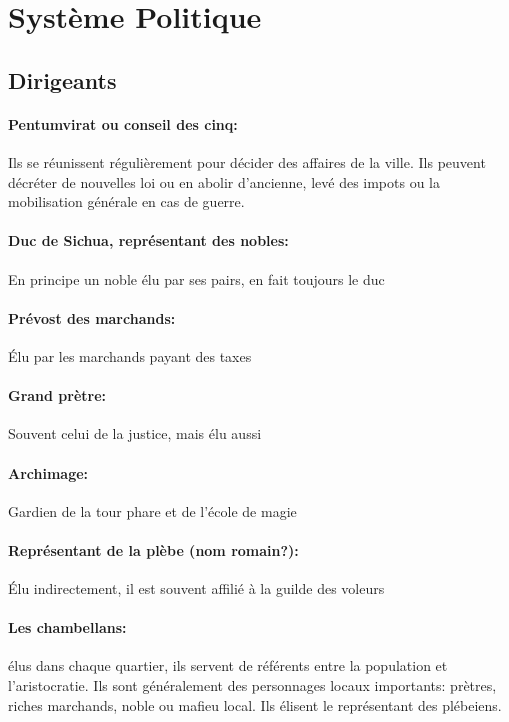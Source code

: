 \section{Système Politique}

\subsection{Dirigeants}

   \paragraph{Pentumvirat ou conseil des cinq: }
       Ils se réunissent régulièrement pour décider des affaires de la 
       ville. Ils peuvent décréter de nouvelles loi ou en abolir d'ancienne,
       levé des impots ou la mobilisation générale en cas de guerre. \\

   \paragraph{Duc de Sichua, représentant des nobles: }
       En principe un noble élu par ses pairs, en fait toujours le duc \\
   \paragraph{Prévost des marchands: }
       Élu par les marchands payant des taxes \\
   \paragraph{Grand prètre: } 
       Souvent celui de la justice, mais élu aussi \\
   \paragraph{Archimage: }
       Gardien de la tour phare et de l'école de magie \\
   \paragraph{Représentant de la plèbe (nom romain?): }
       Élu indirectement, il est souvent affilié à la guilde des voleurs \\

   \paragraph{Les chambellans:} élus dans chaque quartier, ils servent de référents
       entre la population et l'aristocratie. Ils sont généralement des
       personnages locaux importants: prètres, riches marchands, noble
       ou mafieu local. Ils élisent le représentant des plébeiens. \\

